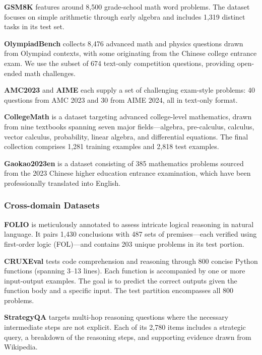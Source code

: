 \textbf{GSM8K} \cite{cobbe2021gsm8k} features around 8,500 grade-school math word problems. The dataset focuses on simple arithmetic through early algebra and includes 1,319 distinct tasks in its test set.

\textbf{OlympiadBench} \cite{he2024olympiadbench} collects 8,476 advanced math and physics questions drawn from Olympiad contexts, with some originating from the Chinese college entrance exam. We use the subset of 674 text-only competition questions, providing open-ended math challenges.

\textbf{AMC2023} \cite{amc} and \textbf{AIME} \cite{aime} each supply a set of challenging exam-style problems: 40 questions from AMC 2023 and 30 from AIME 2024, all in text-only format.

\textbf{CollegeMath} \cite{tang2024mathscale} is a dataset targeting advanced college-level mathematics, drawn from nine textbooks spanning seven major fields—algebra, pre-calculus, calculus, vector calculus, probability, linear algebra, and differential equations. The final collection comprises 1,281 training examples and 2,818 test examples.

\textbf{Gaokao2023en} \cite{liao2024mario} is a dataset consisting of 385 mathematics problems sourced from the 2023 Chinese higher education entrance examination, which have been professionally translated into English. 

\subsubsection{Cross-domain Datasets}
\textbf{FOLIO} \cite{han2022folio} is meticulously annotated to assess intricate logical reasoning in natural language. It pairs 1,430 conclusions with 487 sets of premises—each verified using first-order logic (FOL)—and contains 203 unique problems in its test portion.

\textbf{CRUXEval} \cite{gu2024cruxeval} tests code comprehension and reasoning through 800 concise Python functions (spanning 3–13 lines). Each function is accompanied by one or more input-output examples. The goal is to predict the correct outputs given the function body and a specific input. The test partition encompasses all 800 problems.

\textbf{StrategyQA} \cite{geva2021strategyqa} targets multi-hop reasoning questions where the necessary intermediate steps are not explicit. Each of its 2,780 items includes a strategic query, a breakdown of the reasoning steps, and supporting evidence drawn from Wikipedia.

